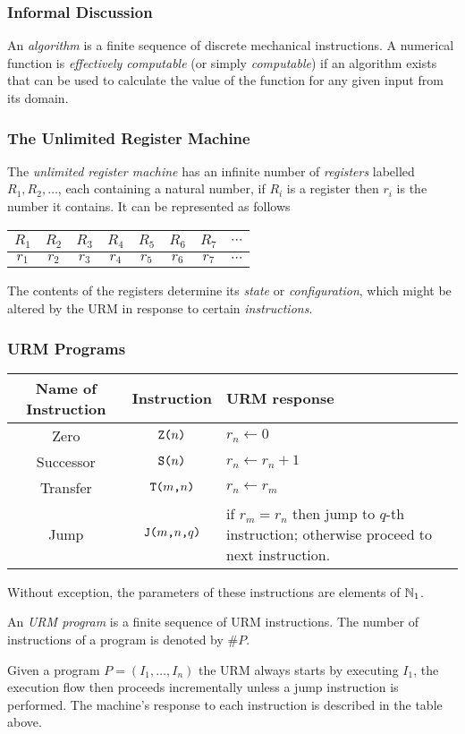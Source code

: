\subsubsection*{Informal Discussion}
An \emph{algorithm} is a finite sequence of discrete mechanical instructions. A numerical function is \emph{effectively computable} (or simply \emph{computable}) if an algorithm exists that can be used to calculate the value of the function for any given input from its domain.

\subsubsection*{The Unlimited Register Machine}
The \emph{unlimited register machine} has an infinite number of \emph{registers} labelled $R_1, R_2, \ldots$, each containing a natural number, if $R_i$ is a register then $r_i$ is the number it contains. It can be represented as follows

\begin{center}
	\begin{tabular}{|c|c|c|c|c|c|c|c}
		\hline
		$R_1$ & $R_2$ & $R_3$ & $R_4$ & $R_5$ & $R_6$ & $R_7$ & $\cdots$\\ 
		\hline
		$r_1$ & $r_2$ & $r_3$ & $r_4$ & $r_5$ & $r_6$ & $r_7$ & $\cdots$  \\
		\hline
	\end{tabular}
\end{center}
The contents of the registers determine its \emph{state} or \emph{configuration}, which might be altered by the URM in response to certain \emph{instructions}. 

\subsubsection*{URM Programs}
\begin{center}
	\begin{tabular}{|c|c|p{11cm}|}
	\hline 
	Name of  Instruction & Instruction & URM response \\
	\hline
	Zero & $\texttt{Z(} n \texttt{)}$ & $r_n \gets 0$ \\ 
	\hline
	Successor & $\texttt{S(} n \texttt{)}$ & $r_n \gets r_n + 1$ \\
	\hline
	Transfer & $\texttt{T(} m \texttt{,} n \texttt{)}$ & $r_n \gets r_m $ \\
	\hline
	Jump & $\texttt{J(} m\texttt{,} n \texttt{,} q \texttt{)}$ & if $r_m = r_n$ then jump to $q$-th instruction; otherwise proceed to next instruction. \\
	\hline
\end{tabular}
\end{center}
Without exception, the parameters of these instructions are elements of $\mathbb{N}_1$.
\begin{definition}
	An \emph{URM program} is a finite sequence of URM instructions.	The number of instructions of a program is denoted by $\#P$.
\end{definition}
Given a program $P = (I_1 , \ldots, I_n)$ the URM always starts by executing $I_1$, the execution flow then proceeds incrementally unless a jump instruction is performed. The machine's response to each instruction is described in the table above.

